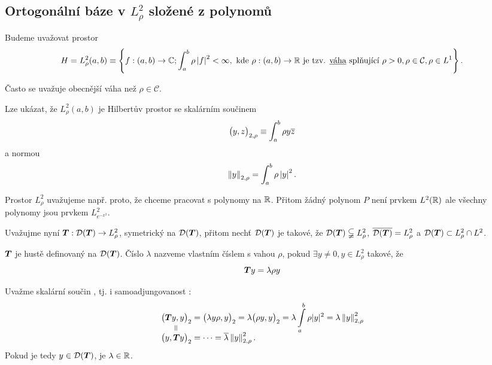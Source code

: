 \subsection{Ortogonální báze v $L^{2}_{\rho}$ složené z polynomů}
Budeme uvažovat prostor
\begin{align*}
    H = L^{2}_{\rho} (a, b) \equiv \left\{ f : (a, b) \to \mathbb{C} ; \int_a^b \rho \left|f\right|^2 < \infty, \text{ kde } \rho : (a, b) \to \mathbb{R} \text{ je tzv. \underline{váha} splňující } \rho > 0, \rho \in \mathcal{C}, \rho \in L^1 \right\}.
\end{align*}

\begin{remark}
    Často se uvažuje obecnější váha než $\rho \in \mathcal{C}$.
\end{remark}

Lze ukázat, že $L^{2}_{\rho}(a, b)$ je Hilbertův prostor se skalárním součinem
\begin{align*}
    \big( y, z \big)_{2, \rho} \equiv \int_a^b \rho y \overline{z}
\end{align*}
a normou
\begin{align*}
    \left\lVert y\right\rVert_{2, \rho} = \int_{a}^{b} \rho \left|y\right|^2.
\end{align*}
\begin{remark}
    Prostor $L^2_{\rho}$ uvažujeme např. proto, že chceme pracovat s polynomy na $\mathbb{R}$. Přitom žádný polynom $P$ není prvkem $L^2(\mathbb{R})$ ale všechny polynomy jsou prvkem $L^2_{e^{-x^2}}$.
\end{remark}

Uvažujme nyní $\boldsymbol{T} : \mathcal{D}(\boldsymbol{T}) \to L^2_{\rho}$, symetrický na $\mathcal{D}(\boldsymbol{T})$, přitom nechť $\mathcal{D}(\boldsymbol{T})$ je takové, že $\mathcal{D}(\boldsymbol{T})\subsetneqq L_\rho^2$, $\overline{\mathcal{D}(\boldsymbol{T})}=L_\rho^2$ a $\mathcal{D}(\boldsymbol{T}) \subset L^2_{\rho} \cap L^2$.

\begin{definition}
    $\boldsymbol{T}$ je hustě definovaný na $\mathcal{D}(\boldsymbol{T})$. Číslo $\lambda$ nazveme vlastním číslem s vahou $\rho$, pokud $\exists y \neq 0, y \in L^2_{\rho}$ takové, že
    \begin{equation}
        \boldsymbol{T} y = \lambda \rho y
    \end{equation}
\end{definition}

Uvažme skalární součin , tj. i samoadjungovanost :
\begin{align*}
    &\underset{\rotatebox[origin=c]{90}{=}}{\innerprod{\map Ty}{y}_2 }= \innerprod{\lambda y\rho}{y}_2 = \lambda \innerprod{\rho y}{y}_2 = \lambda \int\limits_a^b\rho |y|^2=\lambda \norm{y}_{2,\rho}^2 \\[-5pt]
    &\innerprod{y}{\map Ty}_2 = \dots = \conj{\lambda}\norm{y}_{2,\rho}^2.
\end{align*}
Pokud je tedy $y\in\mathcal{D}(\boldsymbol{T})$, je $\lambda \in \mathbb{R}$.

